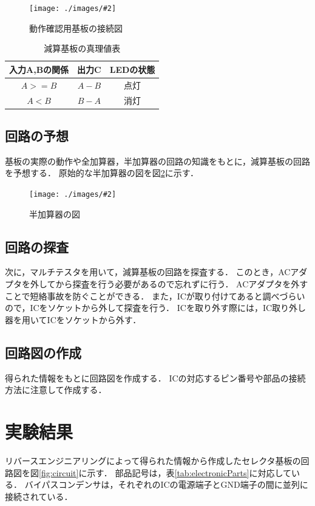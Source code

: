 \documentclass[a4paper,11pt,dvipdfmx]{jsarticle}
\newcommand{\Figure}[4]{
\begin{figure}[H]
\centering
\texttt{[image: ./images/\#2]}
\caption{#3}
\label{fig:#4}
\end{figure}
}
\begin{document}
\Figure{0.5}{全体図.png}{動作確認用基板の接続図}{zentai}

\begin{table}[H]
  \caption{減算基板の真理値表}
  \centering
  \begin{tabular}{|c|c|c|}
    \hline
    入力A,Bの関係 & 出力C & LEDの状態 \\
    \hline
    $A>=B$  & $A-B$   & 点灯    \\
    $A<B$   & $B-A$   & 消灯    \\
    \hline
  \end{tabular}
  \label{tab:genzan}
\end{table}

\subsection{回路の予想}
基板の実際の動作や全加算器，半加算器の回路の知識をもとに，減算基板の回路を予想する．
原始的な半加算器の図を図\ref{fig:halfAdder}に示す．
\Figure{0.4}{HA.drawio.png}{半加算器の図}{halfAdder}

\subsection{回路の探査}
次に，マルチテスタを用いて，減算基板の回路を探査する．
このとき，ACアダプタを外してから探査を行う必要があるので忘れずに行う．
ACアダプタを外すことで短絡事故を防ぐことができる．
また，ICが取り付けてあると調べづらいので，ICをソケットから外して探査を行う．
ICを取り外す際には，IC取り外し器を用いてICをソケットから外す．

\subsection{回路図の作成}
得られた情報をもとに回路図を作成する．
ICの対応するピン番号や部品の接続方法に注意して作成する．

\section{実験結果} \label{sec:result}
リバースエンジニアリングによって得られた情報から作成したセレクタ基板の回路図を図\ref{fig:circuit}に示す．
部品記号は，表\ref{tab:electronicParts}に対応している．
バイパスコンデンサは，それぞれのICの電源端子とGND端子の間に並列に接続されている．
\end{document}
